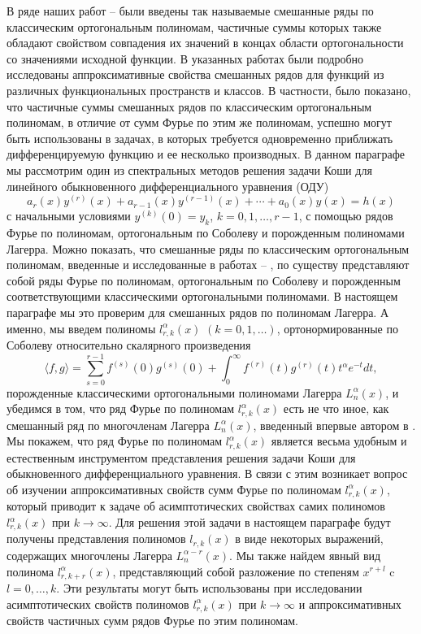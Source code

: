 В ряде наших работ  \cite{sob-lag-smj-Shar11} -- \cite{sob-lag-smj-Shar16} были введены так называемые смешанные ряды по классическим ортогональным полиномам, частичные суммы которых также обладают свойством совпадения их значений в концах области ортогональности  со значениями исходной функции.  В указанных работах были подробно исследованы аппроксимативные свойства смешанных рядов для функций из различных функциональных пространств и классов. В частности, было показано, что частичные суммы смешанных рядов по классическим ортогональным полиномам, в отличие от сумм Фурье по этим же полиномам, успешно могут быть использованы в задачах, в которых требуется одновременно приближать дифференцируемую функцию и ее несколько производных.
В данном параграфе мы рассмотрим один из спектральных методов решения задачи Коши для линейного обыкновенного дифференциального уравнения (ОДУ)
\begin{equation}\label{sob-lag-smj-1.1}
 a_r(x)y^{(r)}(x)+a_{r-1}(x)y^{(r-1)}(x)+\cdots+a_0(x)y(x)=h(x)
 \end{equation}
с начальными условиями $y^{(k)}(0)=y_k$, $k=0,1,\ldots,r-1$, с помощью рядов Фурье по полиномам, ортогональным по Соболеву и порожденным полиномами Лагерра. Можно показать, что смешанные ряды по классическим ортогональным полиномам, введенные и исследованные в  работах \cite{sob-lag-smj-Shar11} -- \cite{sob-lag-smj-Shar16}, по существу представляют собой ряды Фурье по  полиномам, ортогональным по Соболеву и порожденным соответствующими классическими ортогональными полиномами. В настоящем параграфе мы это проверим для смешанных рядов по полиномам Лагерра. А именно, мы  введем полиномы $l^\alpha_{r,k}(x)$ $(k=0,1,\ldots)$, ортонормированные  по Соболеву относительно скалярного произведения
\begin{equation}\label{sob-lag-smj-1.3}
\langle f,g \rangle=\sum_{s=0}^{r-1}f^{(s)}(0)g^{(s)}(0)+\int_0^\infty f^{(r)}(t)g^{(r)}(t)t^\alpha e^{-t}dt,
\end{equation}
порожденные классическими ортогональными полиномами Лагерра  $L_n^\alpha(x)$, и убедимся в  том, что ряд Фурье по полиномам  $l^\alpha_{r,k}(x)$ есть не что иное, как смешанный ряд по многочленам Лагерра $L_n^\alpha(x)$, введенный впервые автором в \cite{sob-lag-smj-Shar13}.
Мы покажем, что ряд Фурье по полиномам  $l^\alpha_{r,k}(x)$ является весьма удобным и естественным  инструментом  представления решения задачи Коши для обыкновенного дифференциального уравнения. В связи с этим возникает вопрос об изучении аппроксимативных свойств сумм Фурье по полиномам $l^\alpha_{r,k}(x)$, который приводит к задаче об асимптотических свойствах самих полиномов $l^\alpha_{r,k}(x)$ при $k\to\infty$. Для решения этой задачи в настоящем параграфе будут получены представления полиномов $l_{r,k}(x)$
в виде некоторых выражений, содержащих   многочлены Лагерра $L_n^{\alpha-r}(x)$. Мы также найдем явный  вид полинома $l^\alpha_{r,k+r}(x)$, представляющий собой разложение по степеням $x^{r+l}$ c $l=0,\ldots,k$. Эти результаты  могут  быть использованы при исследовании асимптотических свойств полиномов $l^\alpha_{r,k}(x)$ при $k\to\infty$ и аппроксимативных свойств частичных сумм рядов Фурье по этим полиномам.




